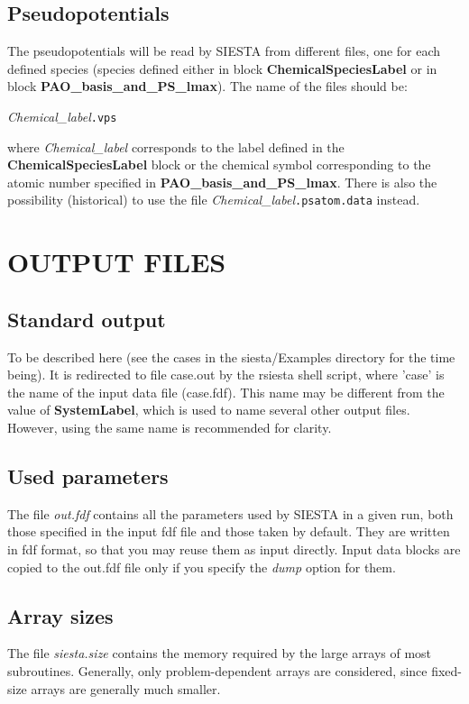 \subsection{Pseudopotentials}

The pseudopotentials will be read by SIESTA from different files, one
for each defined species (species defined either in block
{\bf ChemicalSpeciesLabel} or in block {\bf PAO\_basis\_and\_PS\_lmax}).
The name of the files should be:

{\it Chemical\_label}{\tt .vps}

where {\it Chemical\_label} corresponds to the label defined in the
{\bf ChemicalSpeciesLabel} block or the chemical symbol corresponding to
the atomic number specified in {\bf PAO\_basis\_and\_PS\_lmax}.
There is also the possibility (historical) to use the file 
{\it Chemical\_label}{\tt .psatom.data} instead.


        
\section{OUTPUT FILES}

\subsection{Standard output}
To be described here (see the cases in the siesta/Examples directory 
for the time being).
It is redirected to file case.out by the rsiesta shell script, 
where 'case' is the name of the input data file (case.fdf). 
This name may be different from the value of {\bf SystemLabel}, 
which is used to name several other output files.
However, using the same name is recommended for clarity.


\subsection{Used parameters}
The file {\it out.fdf} contains all the parameters used by SIESTA
in a given run, both those specified in the input fdf file and
those taken by default. They are written in fdf format, so that
you may reuse them as input directly. Input data blocks are 
copied to the out.fdf file only if you specify the {\it dump} option
for them.


\subsection{Array sizes}
The file {\it siesta.size} contains the memory required by the
large arrays of most subroutines. Generally, only problem-dependent
arrays are considered, since fixed-size arrays are generally much smaller.


